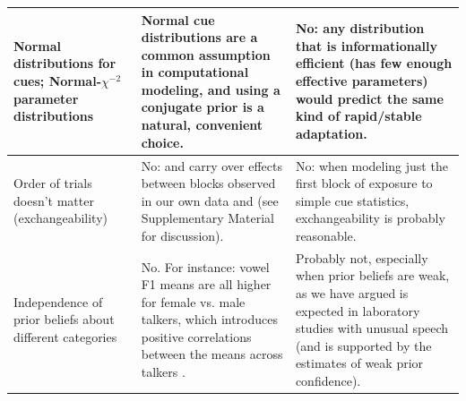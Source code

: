 \begin{footnotesize}
\begin{center}
\begin{longtable}{p{} | p{} | p{}}
\\ \hline
Normal distributions for cues; Normal-$\chi^{-2}$ parameter distributions
  &  Normal cue distributions are a common assumption in computational modeling, and using a conjugate prior is a natural, convenient choice.
  &  No: any distribution that is informationally efficient (has few enough effective parameters) would predict the same kind of rapid/stable adaptation.
\\ \hline
Order of trials doesn't matter (exchangeability)
  &  No: \textcite{Kraljic2008a} and carry over effects between blocks observed in our own data and \textcite{Vroomen2007} (see Supplementary Material for discussion).%
  &  No: when modeling just the first block of exposure to simple cue statistics, exchangeability is probably reasonable.
\\ \hline
Independence of prior beliefs about different categories
  &  No.  For instance: vowel F1 means are all higher for female vs. male talkers, which introduces positive correlations between the means across talkers \autocite{Hillenbrand1995}.
  &  Probably not, especially when prior beliefs are weak, as we have argued is expected in laboratory studies with unusual speech (and is supported by the estimates of weak prior confidence).
\\ \hline

\end{longtable}
\end{center}
\end{footnotesize}
